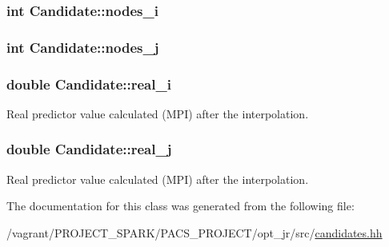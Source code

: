 \hypertarget{classCandidate_a7136b28b9f4ef84a661ba4132f59eaa3}{
\subsubsection[{nodes\-\_\-i}]{\setlength{\rightskip}{0pt plus 5cm}int Candidate\-::nodes\-\_\-i}}\label{classCandidate_a7136b28b9f4ef84a661ba4132f59eaa3}
\hypertarget{classCandidate_affe483f905741a62769d1fbebae48b4e}{
\subsubsection[{nodes\-\_\-j}]{\setlength{\rightskip}{0pt plus 5cm}int Candidate\-::nodes\-\_\-j}}\label{classCandidate_affe483f905741a62769d1fbebae48b4e}
\hypertarget{classCandidate_a93a050a3128d98f446176d9411535eea}{
\subsubsection[{real\-\_\-i}]{\setlength{\rightskip}{0pt plus 5cm}double Candidate\-::real\-\_\-i}}\label{classCandidate_a93a050a3128d98f446176d9411535eea}


Real predictor value calculated (M\-P\-I) after the interpolation. 

\hypertarget{classCandidate_ad7e4bca76815c11f378f005baa93bffb}{
\subsubsection[{real\-\_\-j}]{\setlength{\rightskip}{0pt plus 5cm}double Candidate\-::real\-\_\-j}}\label{classCandidate_ad7e4bca76815c11f378f005baa93bffb}


Real predictor value calculated (M\-P\-I) after the interpolation. 



The documentation for this class was generated from the following file\-:\begin{DoxyCompactItemize}
\item 
/vagrant/\-P\-R\-O\-J\-E\-C\-T\-\_\-\-S\-P\-A\-R\-K/\-P\-A\-C\-S\-\_\-\-P\-R\-O\-J\-E\-C\-T/opt\-\_\-jr/src/\hyperlink{candidates_8hh}{candidates.\-hh}\end{DoxyCompactItemize}
